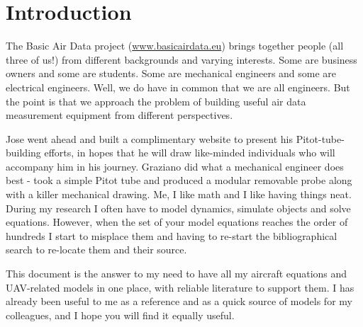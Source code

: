 \chapter{Introduction}

The Basic Air Data project (\url{www.basicairdata.eu}) brings together people (all three of us!) from different backgrounds and varying interests. Some are business owners and some are students. Some are mechanical engineers and some are electrical engineers. Well, we do have in common that we are all engineers. But the point is that we approach the problem of building useful air data measurement equipment from different perspectives.

Jose went ahead and built a complimentary website to present his Pitot-tube-building efforts, in hopes that he will draw like-minded individuals who will accompany him in his journey. Graziano did what a mechanical engineer does best - took a simple Pitot tube and produced a modular removable probe along with a killer mechanical drawing. Me, I like math and I like having things neat. During my research I often have to model dynamics, simulate objects and solve equations. However, when the set of your model equations reaches the order of hundreds I start to misplace them and having to re-start the bibliographical search to re-locate them and their source.

This document is the answer to my need to have all my aircraft equations and UAV-related models in one place, with reliable literature to support them. I has already been useful to me as a reference and as a quick source of models for my colleagues, and I hope you will find it equally useful.